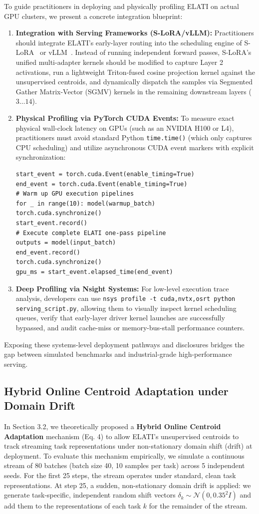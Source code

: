 To guide practitioners in deploying and physically profiling ELATI on actual GPU clusters, we present a concrete integration blueprint:
\begin{enumerate}
    \item \textbf{Integration with Serving Frameworks (S-LoRA/vLLM):} Practitioners should integrate ELATI's early-layer routing into the scheduling engine of S-LoRA~\cite{SLoRA2024} or vLLM~\cite{Kwon2023}. Instead of running independent forward passes, S-LoRA's unified multi-adapter kernels should be modified to capture Layer 2 activations, run a lightweight Triton-fused cosine projection kernel against the unsupervised centroids, and dynamically dispatch the samples via Segmented Gather Matrix-Vector (SGMV) kernels in the remaining downstream layers ($3 \dots 14$).
    \item \textbf{Physical Profiling via PyTorch CUDA Events:} To measure exact physical wall-clock latency on GPUs (such as an NVIDIA H100 or L4), practitioners must avoid standard Python \texttt{time.time()} (which only captures CPU scheduling) and utilize asynchronous CUDA event markers with explicit synchronization:
    \begin{verbatim}
start_event = torch.cuda.Event(enable_timing=True)
end_event = torch.cuda.Event(enable_timing=True)
# Warm up GPU execution pipelines
for _ in range(10): model(warmup_batch)
torch.cuda.synchronize()
start_event.record()
# Execute complete ELATI one-pass pipeline
outputs = model(input_batch)
end_event.record()
torch.cuda.synchronize()
gpu_ms = start_event.elapsed_time(end_event)
    \end{verbatim}
    \item \textbf{Deep Profiling via Nsight Systems:} For low-level execution trace analysis, developers can use \texttt{nsys profile -t cuda,nvtx,osrt python serving\_script.py}, allowing them to visually inspect kernel scheduling queues, verify that early-layer driver kernel launches are successfully bypassed, and audit cache-miss or memory-bus-stall performance counters.
\end{enumerate}
Exposing these systems-level deployment pathways and disclosures bridges the gap between simulated benchmarks and industrial-grade high-performance serving.

\subsection{Hybrid Online Centroid Adaptation under Domain Drift}
\label{subsec:centroid_adaptation_drift_results}
In Section 3.2, we theoretically proposed a \textbf{Hybrid Online Centroid Adaptation} mechanism (Eq. 4) to allow ELATI's unsupervised centroids to track streaming task representations under non-stationary domain shift (drift) at deployment.
To evaluate this mechanism empirically, we simulate a continuous stream of 80 batches (batch size 40, 10 samples per task) across 5 independent seeds.
For the first 25 steps, the stream operates under standard, clean task representations. At step 25, a sudden, non-stationary domain drift is applied: we generate task-specific, independent random shift vectors $\delta_k \sim \mathcal{N}(0, 0.35^2 I)$ and add them to the representations of each task $k$ for the remainder of the stream.

